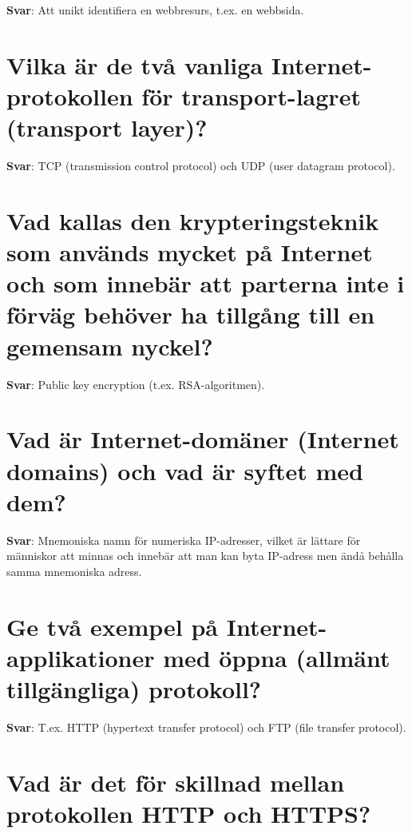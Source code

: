 \documentclass[a4paper,11pt,oneside]{book}
\begin{document}
\begin{sloppypar}
\textbf{Svar}: Att unikt identifiera en webbresurs, t.ex. en webbsida.



\section{Vilka \"ar de tv\r{a} vanliga Internet-protokollen f\"or transport-lagret (transport layer)?}

\label{q:148:sa:sv:True}

\textbf{Svar}: TCP (transmission control protocol) och UDP (user datagram protocol).



\section{Vad kallas den krypteringsteknik som anv\"ands mycket p\r{a} Internet och som inneb\"ar att parterna inte i f\"orv\"ag beh\"over ha tillg\r{a}ng till en gemensam nyckel?}

\label{q:149:sa:sv:True}

\textbf{Svar}: Public key encryption (t.ex. RSA-algoritmen).



\section{Vad \"ar Internet-dom\"aner (Internet domains) och vad \"ar syftet med dem?}

\label{q:150:sa:sv:True}

\textbf{Svar}: Mnemoniska namn f\"or numeriska IP-adresser, vilket \"ar l\"attare f\"or m\"anniskor att minnas och inneb\"ar att man kan byta IP-adress men \"and\r{a} beh\r{a}lla samma mnemoniska adress.



\section{Ge tv\r{a} exempel p\r{a} Internet-applikationer med \"oppna (allm\"ant tillg\"angliga) protokoll?}

\label{q:151:sa:sv:True}

\textbf{Svar}: T.ex. HTTP (hypertext transfer protocol) och FTP (file transfer protocol).



\section{Vad \"ar det f\"or skillnad mellan protokollen HTTP och HTTPS?}


\end{sloppypar}
\end{document}
